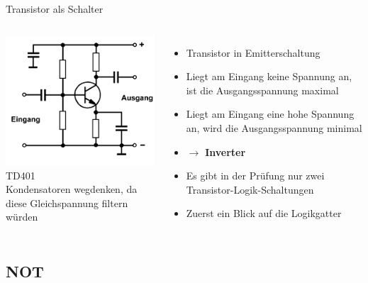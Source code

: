 \begin{frame}{Transistor als Schalter}
  \begin{columns}
      \includegraphics[width=\textwidth,height=.8\textheight,keepaspectratio]{a14/td401.png}\\
      {\tiny TD401 \hyperlink{refs}{\cite{bna}}}\\
      Kondensatoren wegdenken, da diese Gleichspannung filtern würden
      \pause
      \begin{itemize}
        \item Transistor in Emitterschaltung
        \item Liegt am Eingang keine Spannung an, ist die Ausgangsspannung maximal
        \item Liegt am Eingang eine hohe Spannung an, wird die Ausgangsspannung minimal
        \item $\rightarrow$ \textbf{Inverter}
          \pause
        \item Es gibt in der Prüfung nur zwei Transistor-Logik-Schaltungen
        \item Zuerst ein Blick auf die Logikgatter
      \end{itemize}
  \end{columns}
\end{frame}

\subsection{NOT}

